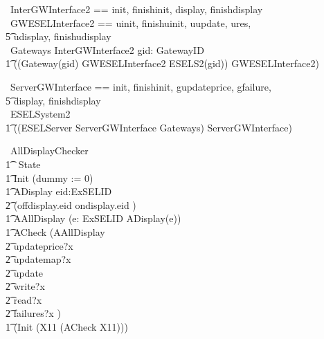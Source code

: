 \begin{circus}
    \circchannelset\ InterGWInterface2 == \lchanset init, finishinit, display, finishdisplay \rchanset \\
    \circchannelset\ GWESELInterface2 == \lchanset uinit, finishuinit, uupdate, ures, \\
                \t5 udisplay, finishudisplay \rchanset \\
    \circprocess\ Gateways \circdef\lpar InterGWInterface2 \rpar  gid: GatewayID \circspot \\
        \t1 ((Gateway(gid) \lpar GWESELInterface2 \rpar ESELS2(gid)) \circhide GWESELInterface2) \\
\end{circus}

\begin{circus}
    \circchannelset\ ServerGWInterface == \lchanset init, finishinit, gupdateprice, gfailure, \\
                \t5 display, finishdisplay \rchanset \\
    \circprocess\ ESELSystem2 \circdef \\
        \t1 ((ESELServer \lpar ServerGWInterface \rpar Gateways) \circhide ServerGWInterface)
\end{circus}



\begin{circus}
	\circprocess\ AllDisplayChecker \circdef \circbegin \\
        \t1 \circstate\ State  \\
    	\t1	Init \circdef (dummy := 0) \\
        \t1 ADisplay \circdef eid:ExSELID \circspot \\
            \t2 (offdisplay.eid \then \Skip \extchoice ondisplay.eid \then \Skip) \\
        \t1 AAllDisplay \circdef (\Interleave e: ExSELID \circspot ADisplay(e)) \\
        \t1 ACheck \circdef (AAllDisplay \extchoice \\
            \t2 updateprice?x \then \Skip \extchoice \\
            \t2 updatemap?x \then \Skip \extchoice \\
            \t2 update \then \Skip \extchoice \\
            \t2 write?x \then \Skip \extchoice \\
            \t2 read?x \then \Skip \extchoice \\
            \t2 failures?x \then \Skip) \\
	    \t1 \circspot  (Init \circseq (\circmu X11 \circspot (ACheck \circseq X11))) \\
	\circend
\end{circus}


